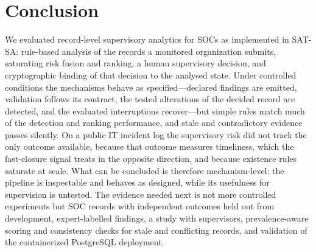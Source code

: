 \section{Conclusion}
\label{sec:conclusion}

We evaluated record-level supervisory analytics for SOCs as implemented in SAT-SA:
rule-based analysis of the records a monitored organization submits, saturating risk
fusion and ranking, a human supervisory decision, and cryptographic binding of that
decision to the analysed state. Under controlled conditions the mechanisms behave as
specified---declared findings are emitted, validation follows its contract, the tested
alterations of the decided record are detected, and the evaluated interruptions
recover---but simple rules match much of the detection and ranking performance, and
stale and contradictory evidence passes silently. On a public IT incident log the
supervisory risk did not track the only outcome available, because that outcome
measures timeliness, which the fast-closure signal treats in the opposite direction,
and because existence rules saturate at scale. What can be concluded is therefore
mechanism-level: the pipeline is inspectable and behaves as designed, while its
usefulness for supervision is untested. The evidence needed next is not more
controlled experiments but SOC records with independent outcomes held out from
development, expert-labelled findings, a study with supervisors, prevalence-aware
scoring and consistency checks for stale and conflicting records, and validation of
the containerized PostgreSQL deployment.

